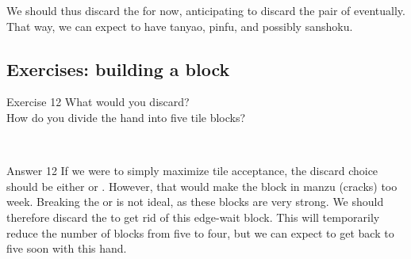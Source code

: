 \emj
We should thus discard the {\LARGE{}} for now, anticipating to discard the pair of {\LARGE{}} eventually. That way, we can expect to have {\jap tanyao}, {\jap pinfu}, and possibly {\jap sanshoku}. 

\vfill

\subsection*{Exercises: building a block}

\bigskip

\bigskip

\begin{itembox}[l]{Exercise 12}
What would you discard? \\
\vsp
How do you divide the hand into five tile blocks? 

\vspace{-30pt}
\bp
{}\\ \vspace{-16pt}
\rfw{}
\ep
\end{itembox}

\newpage

\begin{itembox}[r]{Answer 12}
\emj
If we were to simply maximize tile acceptance, the discard choice should be either {\LARGE{}} or {\LARGE\rfw}. However, that would make the block in {\jap manzu} (cracks) too week. Breaking the {\LARGE{}} or {\LARGE{}} is not ideal, as these blocks are very strong. We should therefore discard the {\LARGE{}} to get rid of this edge-wait block. This will temporarily reduce the number of blocks from five to four, but we can expect to get back to five soon with this hand. 
\end{itembox}

\vfill

